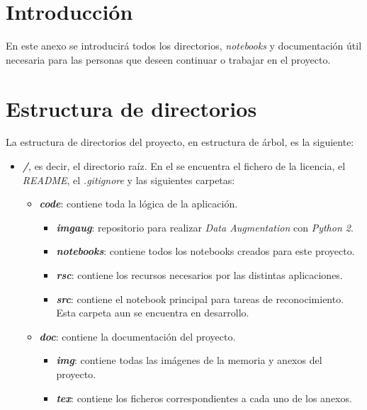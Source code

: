 
\section{Introducción}
En este anexo se introducirá todos los directorios, \textit{notebooks} y documentación útil necesaria para las personas que deseen continuar o trabajar en el proyecto.

\section{Estructura de directorios}
La estructura de directorios del proyecto, en estructura de árbol, es la siguiente:

\begin{itemize}
	\item \textit{\textbf{/}}, es decir, el directorio raíz. En el se encuentra el fichero de la licencia, el \textit{README}, el \textit{.gitignore} y las siguientes carpetas:
	\begin{itemize}
		\item \textit{\textbf{code}}: contiene toda la lógica de la aplicación.
			\begin{itemize}
				\item \textit{\textbf{imgaug}}: repositorio para realizar \textit{Data Augmentation} con \textit{Python 2}.
				\item \textit{\textbf{notebooks}}: contiene todos los notebooks creados para este proyecto.
				\item \textit{\textbf{rsc}}: contiene los recursos necesarios por las distintas aplicaciones.
				\item \textit{\textbf{src}}: contiene el notebook principal para tareas de reconocimiento. Esta carpeta aun se encuentra en desarrollo.
			\end{itemize}
		\item \textit{\textbf{doc}}: contiene la documentación del proyecto.
			\begin{itemize}
				\item \textit{\textbf{img}}: contiene todas las imágenes de la memoria y anexos del proyecto.
				\item \textit{\textbf{tex}}: contiene los ficheros correspondientes a cada uno de los anexos.
			\end{itemize}
	\end{itemize}
\end{itemize}

